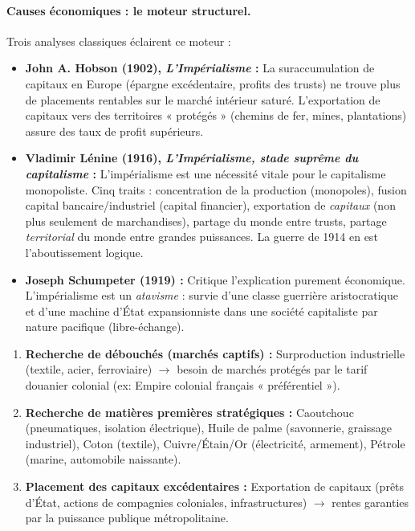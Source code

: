 \documentclass[11pt]{article}
\begin{document}
\paragraph{Causes économiques : le moteur structurel.}
Trois analyses classiques éclairent ce moteur :
\begin{itemize}
    \item \textbf{John A. Hobson (1902), \emph{L'Impérialisme} :} La suraccumulation de capitaux en Europe (épargne excédentaire, profits des trusts) ne trouve plus de placements rentables sur le marché intérieur saturé. L'exportation de capitaux vers des territoires « protégés » (chemins de fer, mines, plantations) assure des taux de profit supérieurs.
    \item \textbf{Vladimir Lénine (1916), \emph{L'Impérialisme, stade suprême du capitalisme} :} L'impérialisme est une nécessité vitale pour le capitalisme monopoliste. Cinq traits : concentration de la production (monopoles), fusion capital bancaire/industriel (capital financier), exportation de \emph{capitaux} (non plus seulement de marchandises), partage du monde entre trusts, partage \emph{territorial} du monde entre grandes puissances. La guerre de 1914 en est l'aboutissement logique.
    \item \textbf{Joseph Schumpeter (1919) :} Critique l'explication purement économique. L'impérialisme est un \emph{atavisme} : survie d'une classe guerrière aristocratique et d'une machine d'État expansionniste dans une société capitaliste par nature pacifique (libre-échange).
\end{itemize}

\begin{aretenir}
\begin{enumerate}
    \item \textbf{Recherche de débouchés (marchés captifs) :} Surproduction industrielle (textile, acier, ferroviaire) $\rightarrow$ besoin de marchés protégés par le tarif douanier colonial (ex: Empire colonial français « préférentiel »).
    \item \textbf{Recherche de matières premières stratégiques :} Caoutchouc (pneumatiques, isolation électrique), Huile de palme (savonnerie, graissage industriel), Coton (textile), Cuivre/Étain/Or (électricité, armement), Pétrole (marine, automobile naissante).
    \item \textbf{Placement des capitaux excédentaires :} Exportation de capitaux (prêts d'État, actions de compagnies coloniales, infrastructures) $\rightarrow$ rentes garanties par la puissance publique métropolitaine.
\end{enumerate}
\end{aretenir}
\end{document}
